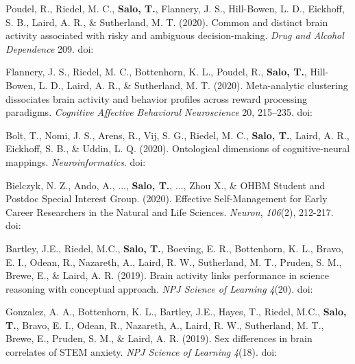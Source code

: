\documentclass[10pt]{article}
\newcommand{\textlink}[3][blue]{\href{#2}{\color{#1}{#3}}}
\begin{document}
\begin{hangparas}{.25in}{1}
	\bigskip

	Poudel, R., Riedel, M. C., \textbf{Salo, T.}, Flannery, J. S., Hill-Bowen, L. D.,
	Eickhoff, S. B., Laird, A. R., \& Sutherland, M. T. (2020).
	Common and distinct brain activity associated with risky and ambiguous decision-making.
	\emph{Drug and Alcohol Dependence} 209.
	doi:\textlink{https://doi.org/10.1016/j.drugalcdep.2020.107884}{10.1016/j.drugalcdep.2020.107884}

	\bigskip

	Flannery, J. S., Riedel, M. C., Bottenhorn, K. L., Poudel, R.,
	\textbf{Salo, T.}, Hill-Bowen, L. D., Laird, A. R., \& Sutherland, M. T. (2020).
	Meta-analytic clustering dissociates brain activity and behavior profiles across reward processing paradigms.
	\emph{Cognitive Affective Behavioral Neuroscience} 20, 215–235.
	doi:\textlink{https://doi.org/10.3758/s13415-019-00763-7}{10.3758/s13415-019-00763-7}

	\bigskip

	Bolt, T., Nomi, J. S., Arens, R., Vij, S. G., Riedel, M. C.,
	\textbf{Salo, T.}, Laird, A. R., Eickhoff, S. B., \& Uddin, L. Q. (2020).
	Ontological dimensions of cognitive-neural mappings. \emph{Neuroinformatics}.
	doi:\textlink{https://doi.org/10.1007/s12021-020-09454-y}{10.1007/s12021-020-09454-y}

	\bigskip

	Bielczyk, N. Z., Ando, A., ..., \textbf{Salo, T.}, ..., Zhou X., \&
	OHBM Student and Postdoc Special Interest Group. (2020).
	Effective Self-Management for Early Career Researchers in the Natural and Life Sciences.
	\emph{Neuron}, \emph{106}(2), 212-217.
	doi:\textlink{https://doi.org/10.1016/j.neuron.2020.03.015}{10.1016/j.neuron.2020.03.015}

	\bigskip

	Bartley, J.E., Riedel, M.C., \textbf{Salo, T.}, Boeving, E. R., Bottenhorn, K. L.,
	Bravo, E. I., Odean, R., Nazareth, A., Laird, R. W., Sutherland, M. T.,
	Pruden, S. M., Brewe, E., \& Laird, A. R. (2019).
	Brain activity links performance in science reasoning with conceptual approach.
	\emph{NPJ Science of Learning} \emph{4}(20).
	doi:\textlink{https://doi.org/10.1038/s41539-019-0059-8}{10.1038/s41539-019-0059-8}

	\bigskip

	Gonzalez, A. A., Bottenhorn, K. L., Bartley, J.E., Hayes, T., Riedel, M.C.,
	\textbf{Salo, T.}, Bravo, E. I., Odean, R., Nazareth, A., Laird, R. W., Sutherland, M. T.,
	Brewe, E., Pruden, S. M., \& Laird, A. R. (2019).
	Sex differences in brain correlates of STEM anxiety.
	\emph{NPJ Science of Learning} \emph{4}(18).
	doi:\textlink{https://doi.org/10.1038/s41539-019-0058-9}{10.1038/s41539-019-0058-9}


\end{hangparas}
\end{document}

